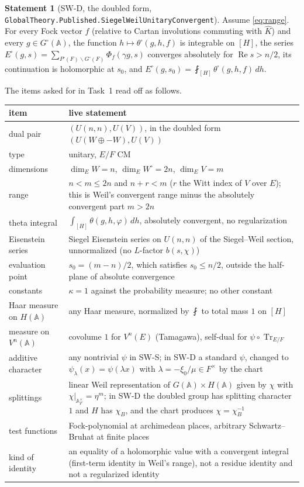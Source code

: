 \documentclass[11pt]{article}
\newcommand{\lean}[1]{\nolinkurl{#1}}
\theoremstyle{definition}
\newtheorem{statement}[lemma]{Statement}
\begin{document}
\begin{statement}[SW-D, the doubled form, \lean{GlobalTheory.Published.SiegelWeilUnitaryConvergent}]\label{st:swd}
Assume \eqref{eq:range}. For every Fock vector $f$ (relative to Cartan involutions commuting with $\widehat K$) and every $g\in G^\square(\mathbb A)$, the function $h\mapsto\theta^\square(g,h,f)$ is integrable on $[H]$, the series $E^\square(g,s)=\sum_{P^\square(F)\backslash G^\square(F)}\Phi_f(\gamma g,s)$ converges absolutely for $\operatorname{Re}s>n/2$, its continuation is holomorphic at $s_0$, and $E^\square(g,s_0)=\fint_{[H]}\theta^\square(g,h,f)\,dh$.
\end{statement}

The items asked for in Task~1 read off as follows.

\begin{center}
\begin{longtable}{L{4.2cm}L{10.8cm}}
\toprule
item & live statement\\
\midrule
dual pair & $(U(n,n),U(V))$, in the doubled form $(U(W\oplus-W),U(V))$\\
type & unitary, $E/F$ CM\\
dimensions & $\dim_EW=n$, $\dim_E W^\square=2n$, $\dim_EV=m$\\
range & $n<m\le 2n$ and $n+r<m$ ($r$ the Witt index of $V$ over $E$); this is Weil's convergent range minus the absolutely convergent part $m>2n$\\
theta integral & $\int_{[H]}\theta(g,h,\varphi)\,dh$, absolutely convergent, no regularization\\
Eisenstein series & Siegel Eisenstein series on $U(n,n)$ of the Siegel--Weil section, unnormalized (no $L$-factor $b(s,\chi)$)\\
evaluation point & $s_0=(m-n)/2$, which satisfies $s_0\le n/2$, outside the half-plane of absolute convergence\\
constants & $\kappa=1$ against the probability measure; no other constant\\
Haar measure on $H(\mathbb A)$ & any Haar measure, normalized by $\fint$ to total mass $1$ on $[H]$\\
measure on $V^n(\mathbb A)$ & covolume $1$ for $V^n(E)$ (Tamagawa), self-dual for $\psi\circ\operatorname{Tr}_{E/F}$\\
additive character & any nontrivial $\psi$ in SW-S; in SW-D a standard $\psi$, changed to $\psi_\lambda(x)=\psi(\lambda x)$ with $\lambda=-\xi_0/\mu\in F^\times$ by the chart\\
splittings & linear Weil representation of $G(\mathbb A)\times H(\mathbb A)$ given by $\chi$ with $\chi|_{\mathbb A_F^\times}=\eta^m$; in SW-D the doubled group has splitting character $1$ and $H$ has $\chi_B$, and the chart produces $\chi=\chi_B^{-1}$\\
test functions & Fock-polynomial at archimedean places, arbitrary Schwartz--Bruhat at finite places\\
kind of identity & an equality of a holomorphic value with a convergent integral (first-term identity in Weil's range), not a residue identity and not a regularized identity\\
\bottomrule
\end{longtable}
\end{center}
\end{document}
